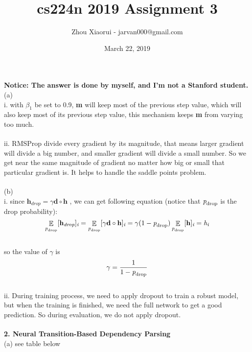 \documentclass{article}
\title{cs224n 2019 Assignment 3}
\author{Zhou Xiaorui - jarvan000@gmail.com}
\date{March 22, 2019}
\DeclareMathOperator{\E}{\mathbb{E}}
\begin{document}
\maketitle
\textbf{Notice: The answer is done by myself, and I'm not a Stanford student.}
\\
(a)
\\
i. with \(\beta_1\) be set to 0.9, \textbf{m} will keep most of the previous step value, which will also keep most of its previous step value, this mechanism keeps \textbf{m} from varying too much.
\\
\\
ii. RMSProp divide every gradient by its magnitude, that means larger gradient will divide a big number, and smaller gradient will divide a small number. So we get near the same magnitude of gradient no matter how big or small that particular gradient is. It helps to handle the saddle points problem.
\\
\\
(b)
\\
i. since \( \textbf{h}_{\textit{drop}} = \gamma \textbf{d} \circ \textbf{h} \) , we can get following equation (notice that \(\textit{p}_{\rm drop}\) is the drop probability):
\\
\[ \E_{\textit{p}_{\rm drop}} [\textbf{h}_{\textit{drop}}]_{\textit{i}} = \E_{\textit{p}_{\rm drop}} [\gamma \textbf{d} \circ \textbf{h}]_{\textit{i}} = \gamma (1 - \textit{p}_{\rm drop}) \E_{\textit{p}_{\rm drop}} [\textbf{h}]_{\textit{i}} = \textit{h}_{\textit{i}} \]
\\
so the value of \(\gamma\) is 
\\
\[ \gamma = \frac {1} {1- \textit{p}_{\rm drop}} \]
\\
ii. During training process, we need to apply dropout to train a robust model, but when the training is finished, we need the full network to get a good prediction. So during evaluation, we do not apply dropout.
\\
\\
\textbf{2. Neural Transition-Based Dependency Parsing}
\\
(a) see table below
\end{document}
